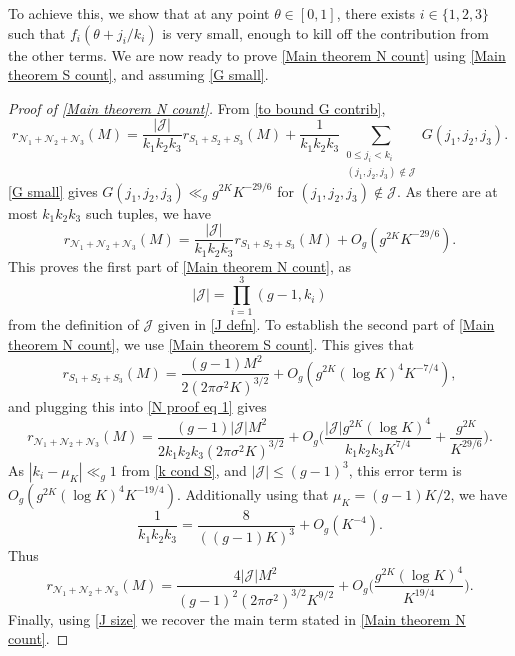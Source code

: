 \documentclass[hidelinks,11pt,reqno]{amsart}
\renewcommand{\leq}{\leqslant}
\theoremstyle{remark}
\begin{document}
To achieve this, we show that at any point $\theta\in [0,1]$, there exists $i\in \{1,2,3\}$ such that $f_{i}(\theta+j_{i}/k_{i})$ is very small, enough to kill off the contribution from the other terms. We are now ready to prove \cref{Main theorem N count} using \cref{Main theorem S count}, and assuming \cref{G small}. 
\begin{proof}[Proof of \cref{Main theorem N count}]
From \cref{to bound G contrib},
\[r_{\mathcal{N}_{1}+\mathcal{N}_{2}+\mathcal{N}_{3}}(M)=\frac{|\mathcal{J}|}{k_{1}k_{2}k_{3}}r_{S_{1}+S_{2}+S_{3}}(M)+\frac{1}{k_{1}k_{2}k_{3}}\sum_{\substack{0\leq j_{i}<k_{i}\\(j_{1},j_{2},j_{3})\notin \mathcal{J}}}G(j_{1},j_{2},j_{3}).\]
\cref{G small} gives  $G(j_{1},j_{2},j_{3})\ll_{g}g^{2K}K^{-29/6}$ for $(j_{1},j_{2},j_{3})\notin \mathcal{J}$. As there are at most $k_{1}k_{2}k_{3}$ such tuples, we have
\begin{equation}\label{N proof eq 1}
    r_{\mathcal{N}_{1}+\mathcal{N}_{2}+\mathcal{N}_{3}}(M)=\frac{|\mathcal{J}|}{k_{1}k_{2}k_{3}}r_{S_{1}+S_{2}+S_{3}}(M)+O_{g}(g^{2K}K^{-29/6}).
\end{equation}
This proves the first part of \cref{Main theorem N count}, as
\begin{equation}\label{J size}
    |\mathcal{J}|=\prod_{i=1}^{3}(g-1,k_{i})
\end{equation}
from the definition of $\mathcal{J}$ given in \cref{J defn}. To establish the second part of \cref{Main theorem N count}, we use \cref{Main theorem S count}. This gives that
\[r_{S_{1}+S_{2}+S_{3}}(M)=\frac{(g-1)M^{2}}{2(2\pi\sigma^{2}K)^{3/2}}+O_{g}(g^{2K}(\log K)^{4}K^{-7/4}),\]
and plugging this into \cref{N proof eq 1} gives
\[  r_{\mathcal{N}_{1}+\mathcal{N}_{2}+\mathcal{N}_{3}}(M)=\frac{(g-1)|\mathcal{J}|M^{2}}{2k_{1}k_{2}k_{3}(2\pi\sigma^{2}K)^{3/2}}+O_{g}\Big (\frac{|\mathcal{J}|g^{2K}(\log K)^{4}}{k_{1}k_{2}k_{3}K^{7/4}}+\frac{g^{2K}}{K^{29/6}}\Big).\]
As $|k_{i}-\mu_{K}|\ll_{g} 1$ from \cref{k cond S}, and $|\mathcal{J}|\leq (g-1)^{3}$, this error term is $O_{g}(g^{2K}(\log K)^{4}K^{-19/4})$. Additionally using that $\mu_{K}=(g-1)K/2$, we have
    \[\frac{1}{k_{1}k_{2}k_{3}}=\frac{8}{((g-1)K)^{3}}+O_{g}(K^{-4}).\]
Thus
\[r_{\mathcal{N}_{1}+\mathcal{N}_{2}+\mathcal{N}_{3}}(M)=\frac{4|\mathcal{J}|M^{2}}{(g-1)^{2}(2\pi\sigma^{2})^{3/2}K^{9/2}}+O_{g}\Big (\frac{g^{2K}(\log K)^{4}}{K^{19/4}}\Big).\]
Finally, using \cref{J size} we recover the main term stated in \cref{Main theorem N count}.
\end{proof}
\end{document}
